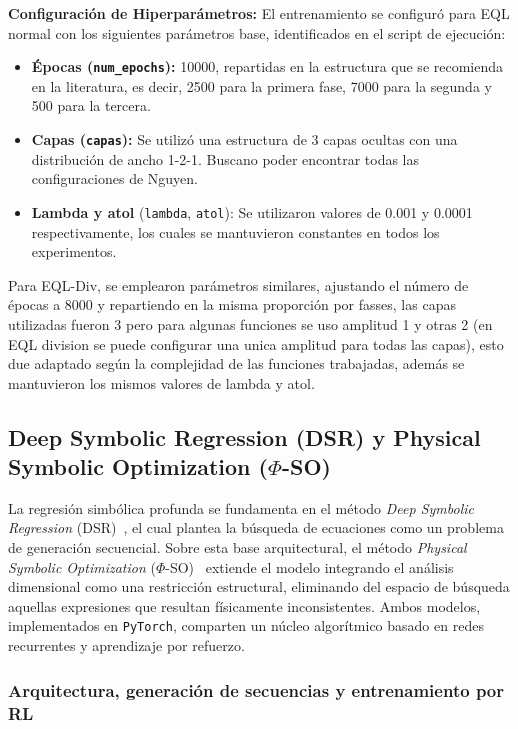 \textbf{Configuración de Hiperparámetros:}
El entrenamiento se configuró para EQL normal con los siguientes parámetros base, identificados en el script de ejecución:
\begin{itemize}
    \item \textbf{Épocas (\texttt{num\_epochs}):} 10000, repartidas en la estructura que se recomienda en la literatura, es decir, 2500 para la primera fase, 7000 para la segunda y 500 para la tercera.
    \item \textbf{Capas (\texttt{capas}):} Se utilizó una estructura de 3 capas ocultas con una distribución de ancho 1-2-1. Buscano poder encontrar todas las configuraciones de Nguyen.
    \item \textbf{Lambda y atol} (\texttt{lambda}, \texttt{atol}): Se utilizaron valores de 0.001 y 0.0001 respectivamente, los cuales se mantuvieron constantes en todos los experimentos.
\end{itemize}

Para EQL-Div, se emplearon parámetros similares, ajustando el número de épocas a 8000 y repartiendo en la misma proporción por fasses, las capas utilizadas fueron 3 pero para algunas funciones se uso amplitud 1 y otras 2 (en EQL division se puede configurar una unica amplitud para todas las capas), esto due adaptado según la complejidad de las funciones trabajadas, además se mantuvieron los mismos valores de lambda y atol.\\






\subsection{Deep Symbolic Regression (DSR) y Physical Symbolic Optimization ($\Phi$-SO)}

La regresión simbólica profunda se fundamenta en el método \textit{Deep Symbolic Regression} (DSR)~\cite{4}, el cual plantea la búsqueda de ecuaciones como un problema de generación secuencial. Sobre esta base arquitectural, el método \textit{Physical Symbolic Optimization} ($\Phi$-SO)~\cite{5} extiende el modelo integrando el análisis dimensional como una restricción estructural, eliminando del espacio de búsqueda aquellas expresiones que resultan físicamente inconsistentes. Ambos modelos, implementados en \texttt{PyTorch}, comparten un núcleo algorítmico basado en redes recurrentes y aprendizaje por refuerzo.

\subsubsection{Arquitectura, generación de secuencias y entrenamiento por RL}

